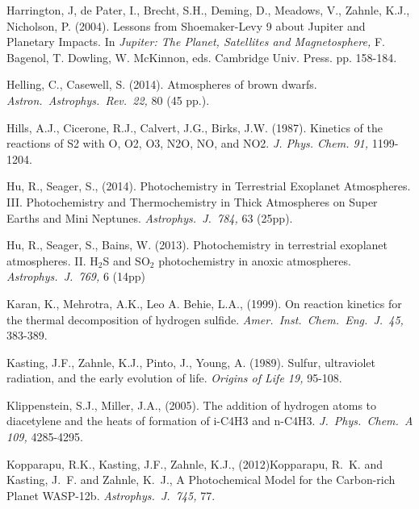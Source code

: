 \documentclass[preprint]{aastex6}
\newcounter{reaction}
\begin{document}
\begin{thebibliography}{00}
Harrington, J, de Pater, I., Brecht, S.H., Deming, D., Meadows, V., Zahnle, K.J., Nicholson, P. (2004).
Lessons from Shoemaker-Levy 9 about Jupiter and Planetary Impacts.
In {\em Jupiter: The Planet, Satellites and Magnetosphere,} F. Bagenol, T. Dowling, W. McKinnon, eds.
Cambridge Univ. Press. pp. 158-184.

Helling, C., Casewell, S. (2014).
Atmospheres of brown dwarfs.
{\em Astron.\ Astrophys.\ Rev.\ 22,} 80 (45 pp.).

Hills, A.J., Cicerone, R.J., Calvert, J.G., Birks, J.W. (1987).
Kinetics of the reactions of S2 with O, O2, O3, N2O, NO, and NO2. 
{\em J. Phys. Chem. 91,} 1199-1204.

Hu, R., Seager, S., (2014).
Photochemistry in Terrestrial Exoplanet Atmospheres. III.
Photochemistry and Thermochemistry in Thick Atmospheres on Super Earths and Mini Neptunes.
{\em Astrophys.\ J.\  784,} 63 (25pp). 

Hu, R., Seager, S., Bains, W. (2013).
Photochemistry in terrestrial exoplanet atmospheres.
II. H$_2$S and SO$_2$ photochemistry in anoxic atmospheres.
{\em Astrophys.\ J.\  769,} 6 (14pp) 


Karan, K., Mehrotra, A.K., Leo A. Behie, L.A., (1999).
On reaction kinetics for the thermal decomposition of hydrogen sulfide.
{\em Amer.\ Inst.\ Chem.\ Eng.\ J.\ 45,} 383-389.

Kasting, J.F., Zahnle, K.J., Pinto, J., Young, A. (1989). 
Sulfur, ultraviolet radiation, and the early evolution of life.
{\em Origins of Life 19,} 95-108.

Klippenstein, S.J., Miller, J.A., (2005).
The addition of hydrogen atoms to diacetylene and the heats of formation of i-C4H3 and n-C4H3.
{\em J.\ Phys.\ Chem.\ A 109,} 4285-4295.

Kopparapu, R.K., Kasting, J.F., Zahnle, K.J., (2012){{Kopparapu}, R.~K. and {Kasting}, J.~F. and {Zahnle}, K.~J.},
A Photochemical Model for the Carbon-rich Planet WASP-12b.
{\em Astrophys.\ J.\  745,} 77. 


\end{thebibliography}
\end{document}
